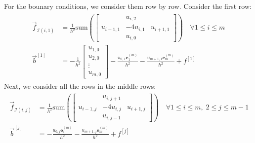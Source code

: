 \documentclass[]{article}
\begin{document}
        \par
        For the bounary conditions, we consider them row by row. Consider the first row: 
        \begin{align*}\tag{1.2}\label{eqn:1.2}
            \begin{aligned}
                \vec{f}_{\mathcal{I}(i, 1)} &= 
                \frac{1}{h^2}
                \text{sum}
                \left(
                    \begin{bmatrix}
                        & u_{i, 2}& 
                        \\
                        u_{i - 1, 1} & -4u_{i, 1}& u_{i + 1, 1}
                        \\
                        & u_{i, 0}& 
                    \end{bmatrix}
                \right) \quad \forall 1 \le i \le m
                \\
                \vec{b}^{[1]} &= 
                - \frac{1}{h^2}\begin{bmatrix}
                    u_{1, 0} \\ u_{2, 0} \\ \vdots \\ u_{m, 0}
                \end{bmatrix}
                - \frac{u_{0, 1}\mathbf{e}_1^{(m)}}{h^2} 
                - \frac{u_{m + 1, 1} \mathbf{e}_{m}^{(m)}}{h^2}
                + f^{[1]}
            \end{aligned}
        \end{align*}
        Next, we consider all the rows in the middle rows: 
        \begin{align*}\tag{1.3}\label{eqn:1.3}
            \begin{aligned}
                \vec{f}_{\mathcal{I}(i, j)} &= 
                \frac{1}{h^2}
                \text{sum}
                \left(
                    \begin{bmatrix}
                        & u_{i, j + 1}& 
                        \\
                        u_{i - 1, j} & -4u_{i, j}& u_{i + 1, j}
                        \\
                        & u_{i, j - 1}& 
                    \end{bmatrix}
                \right) \quad \forall 1 \le i \le m , \; 2 \le j \le m - 1
                \\
                \vec{b}^{[j]} &= 
                - \frac{u_{0, j}\mathbf{e}_{1}^{(m)}}{h^2}
                -
                \frac{u_{m+ 1,j}\mathbf{e}_m^{(m)}}{h^2}
                + f^{[j]}
            \end{aligned}
        \end{align*}
\end{document}

